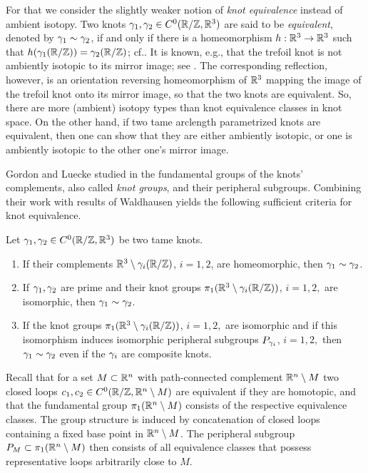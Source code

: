 For that we consider the slightly weaker notion
of \emph{knot equivalence} instead of ambient isotopy. Two knots $\gamma_1,\gamma_2\in
C^0(\mathbb{R}/\mathbb{Z},\mathbb{R}^3)$ are said to be \emph{equivalent}, denoted by $\gamma_1\sim\gamma_2$, if and
only if there is a homeomorphism $h:\mathbb{R}^3\to\mathbb{R}^3$ such that $h(\gamma_1(\mathbb{R}/\mathbb{Z}))=\gamma_2(\mathbb{R}/\mathbb{Z})$;
cf.\@ \cite[p. 4]{crowell-fox_1977}. It is known, e.g., that the trefoil knot is not
ambiently isotopic to its mirror image; see \cite[Theorem~3.39 (b)]{burde-zieschang_2014}. The corresponding reflection, however,
is an orientation reversing homeomorphism of $\mathbb{R}^3$ mapping the image of the trefoil
knot onto its mirror image, so that the two knots are equivalent.  So, there are
more (ambient) isotopy types than knot equivalence classes in knot space. On the other
hand, if two tame
arclength parametrized knots are equivalent, then one
can show that they are either ambiently
isotopic, or one is ambiently isotopic to the other one's mirror image. 

Gordon and Luecke studied in \cite{gordon-luecke_1989}
the fundamental groups of the knots' complements, also 
called \emph{knot groups}, and their peripheral subgroups. Combining their work
with results of Waldhausen \cite{waldhausen_1968} yields the following sufficient
criteria for knot equivalence.
\begin{externaltheorem}\label{thm:gordon-luecke}
Let  $\gamma_1,\gamma_2\in C^0(\mathbb{R}/\mathbb{Z},\mathbb{R}^3)$ be two tame knots.
\begin{enumerate}
\item[\rm (i)] If their complements $\mathbb{R}^3\setminus\gamma_i(\mathbb{R}/\mathbb{Z})$, $i=1,2$, are homeomorphic,
then $\gamma_1\sim\gamma_2$.
\item[\rm (ii)] If $\gamma_1,\gamma_2$ are prime and their knot groups 
$\pi_1(\mathbb{R}^3\setminus\gamma_i(\mathbb{R}/\mathbb{Z}))$, $i=1,2,$ are isomorphic,  then $\gamma_1\sim\gamma_2$. 
\item[\rm (iii)] If the knot groups $\pi_1(\mathbb{R}^3\setminus\gamma_i(\mathbb{R}/\mathbb{Z}))$, $i=1,2,$ 
are isomorphic and if this isomorphism induces isomorphic peripheral subgroups $P_{\gamma_i}$, $i=1,2,$
then $\gamma_1\sim\gamma_2$ even if the $\gamma_i$ are composite knots.
\end{enumerate}
\end{externaltheorem}


Recall that for a set $M\subset\mathbb{R}^n$ with path-connected complement $\mathbb{R}^n\setminus M$
two closed loops $c_1,c_2\in C^0(\mathbb{R}/\mathbb{Z},\mathbb{R}^n\setminus M)$ are equivalent if they are
homotopic, and that the fundamental group $\pi_1(\mathbb{R}^n\setminus M)$ consists of
the  respective equivalence classes. The group  structure is induced by concatenation
of closed loops containing a fixed base point in $\mathbb{R}^n\setminus M$. The peripheral
subgroup $P_M\subset\pi_1(\mathbb{R}^n\setminus M)$ then consists of all equivalence classes that
possess representative loops arbitrarily close to $M$.


